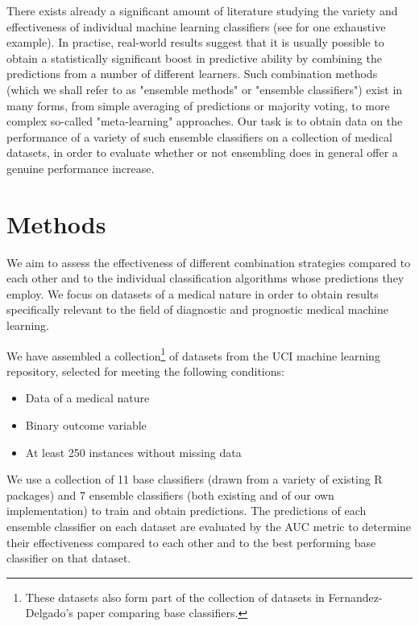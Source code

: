 \documentclass{bmcart}
\begin{document}
There exists already a significant amount of literature studying the variety and effectiveness of individual machine learning classifiers (see \cite{classifiercomparison} for one exhaustive example). In practise, real-world results suggest that it is usually possible to obtain a statistically significant boost in predictive ability by combining the predictions from a number of different learners. Such combination methods (which we shall refer to as "ensemble methods" or "ensemble classifiers") exist in many forms, from simple averaging of predictions or majority voting, to more complex so-called "meta-learning" approaches. Our task is to obtain data on the performance of a variety of such ensemble classifiers on a collection of medical datasets, in order to evaluate whether or not ensembling does in general offer a genuine performance increase.






\section*{Methods}
We aim to assess the effectiveness of different combination strategies compared to each other and to the individual classification algorithms whose predictions they employ.  We focus on datasets of a medical nature in order to obtain results specifically relevant to the field of diagnostic and prognostic medical machine learning.

We have assembled a collection\footnote{These datasets also form part of the collection of datasets in Fernandez-Delgado's paper \cite{classifiercomparison} comparing base classifiers.} of datasets from the UCI machine learning repository, selected for meeting the following conditions:

\begin{itemize}
\item Data of a medical nature
\item Binary  outcome variable
\item At least 250 instances without missing data
\end{itemize}

\noindent
We use a collection of 11 base classifiers (drawn from a variety of existing R packages) and 7 ensemble classifiers (both existing and of our own implementation) to train and obtain predictions. The predictions of each ensemble classifier on each dataset are evaluated by the AUC metric to determine their effectiveness compared to each other and to the best performing base classifier on that dataset.
\end{document}
